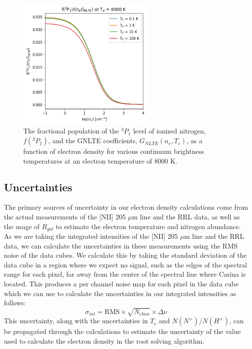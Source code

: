 \begin{figure}[t]
    \centering
    \includegraphics[width=0.6\textwidth]{figs/carina/gnlte_curves.png}
    \caption[Fractional Population of the {[}NII{]} 205 $\mu$m Line and G$_{NLTE}$ Coefficients as a Function of Electron Density]{
        The fractional population of the $^3P_1$ level of ionized nitrogen, $f(^3P_1)$, and the GNLTE coefficients, $G_{NLTE}(n_e,T_c)$, as a function of electron density for various continuum brightness temperatures at an electron temperature of 8000 K.
        }
    \label{carina/eq:gnlte_curves}
\end{figure}

\subsection{Uncertainties}
The primary sources of uncertainty in our electron density calculations come from the actual measurements of the [NII] 205 $\mu$m line and the RRL data, as well as the usage of $R_{gal}$ to estimate the electron temperature and nitrogen abundance.
As we are taking the integrated intensities of the [NII] 205 $\mu$m line and the RRL data, we can calculate the uncertainties in these measurements using the RMS noise of the data cubes.
We calculate this by taking the standard deviation of the data cube in a region where we expect no signal, such as the edges of the spectral range for each pixel, far away from the center of the spectral line where Carina is located. 
This produces a per channel noise map for each pixel in the data cube which we can use to calculate the uncertainties in our integrated intensities as follows:
\begin{equation}
    \sigma_{int} = \text{RMS} \times \sqrt{N_{chan}} \times \Delta \nu
    \label{carina/eq:uncertainty_intensity}
\end{equation}
This uncertainty, along with the uncertainties in $T_e$ and $N(N^+)/N(H^+)$, can be propagated through the calculations to estimate the uncertainty of the value used to calculate the electron density in the root solving algorithm.

